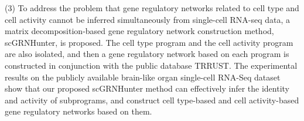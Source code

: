 \begin{abstracten}
(3) To address the problem that gene regulatory networks related to cell type and cell activity cannot be inferred simultaneously from single-cell RNA-seq data, 
a matrix decomposition-based gene regulatory network construction method, scGRNHunter, is proposed. 
The cell type program and the cell activity program are also isolated, and then a gene regulatory network based on each program is constructed in conjunction with the public database TRRUST. 
The experimental results on the publicly available brain-like organ single-cell RNA-Seq dataset show that our proposed scGRNHunter method can effectively infer the identity and activity of subprograms, 
and construct cell type-based and cell activity-based gene regulatory networks based on them.





\end{abstracten}
